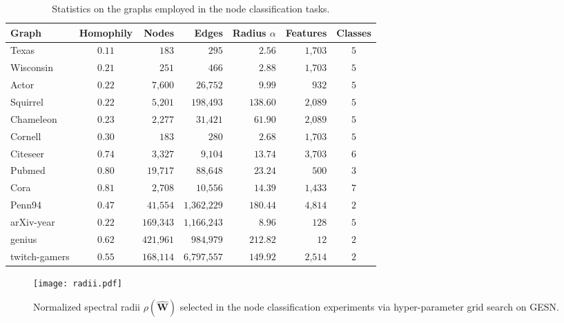 \documentclass[final,5p,times,twocolumn]{elsarticle}
\begin{document}
\begin{table*}
	\centering
	\begin{tabular}{lcrrrrc}
		\toprule
		\textbf{Graph} & \textbf{Homophily} & \textbf{Nodes} & \textbf{Edges} & \textbf{Radius} $\alpha$ & \textbf{Features} & \textbf{Classes} \\
		\midrule
		Texas & $0.11$ & $183$ & $295$ & $2.56$ & $1\mathord{,}703$ & $5$ \\
		Wisconsin & $0.21$ & $251$ & $466$ & $2.88$ & $1\mathord{,}703$ & $5$ \\
		Actor & $0.22$ & $7\mathord{,}600$ & $26\mathord{,}752$ & $9.99$ & $932$ & $5$ \\
		Squirrel & $0.22$ & $5\mathord{,}201$ & $198\mathord{,}493$ & $138.60$ & $2\mathord{,}089$ & $5$ \\
		Chameleon & $0.23$ & $2\mathord{,}277$ & $31\mathord{,}421$ & $61.90$ & $2\mathord{,}089$ & $5$ \\
		Cornell & $0.30$ & $183$ & $280$ & $2.68$ & $1\mathord{,}703$ & $5$ \\
		\midrule
		Citeseer & $0.74$ & $3\mathord{,}327$ & $9\mathord{,}104$ & $13.74$ & $3\mathord{,}703$ & $6$ \\
		Pubmed & $0.80$ & $19\mathord{,}717$ & $88\mathord{,}648$ & $23.24$ & $500$ & $3$ \\
		Cora & $0.81$ & $2\mathord{,}708$ & $10\mathord{,}556$ & $14.39$ & $1\mathord{,}433$ & $7$ \\
		\midrule
		Penn94 & $0.47$ & $41\mathord{,}554$ & $1\mathord{,}362\mathord{,}229$ & $180.44$ & $4\mathord{,}814$ & $2$ \\
		arXiv-year & $0.22$ & $169\mathord{,}343$ & $1\mathord{,}166\mathord{,}243$ & $8.96$ & $128$ & $5$ \\
		genius & $0.62$ & $421\mathord{,}961$ & $984\mathord{,}979$ & $212.82$ & $12$ & $2$ \\
		twitch-gamers & $0.55$ & $168\mathord{,}114$ & $6\mathord{,}797\mathord{,}557$ & $149.92$ & $2\mathord{,}514$ & $2$ \\
		\bottomrule
	\end{tabular}
\caption{Statistics on the graphs employed in the node classification tasks.}
\label{tab:task-stats}
\end{table*}

\begin{figure}
	\centering
	\texttt{[image: radii.pdf]}
	\caption{Normalized spectral radii $\rho(\mathbf{\hat{W}})$ selected in the node classification experiments via hyper-parameter grid search on GESN.}
	\label{fig:radii}
\end{figure}
\end{document}
